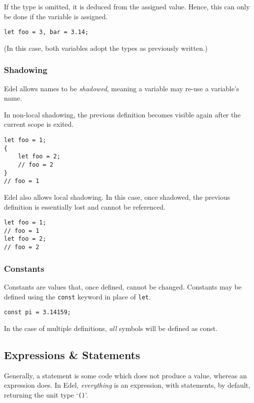 \documentclass{article}
\begin{document}
    If the type is omitted, it is deduced from the assigned value.
    Hence, this can only be done if the variable is assigned.
    \begin{lstlisting}[language=CustomLang]
let foo = 3, bar = 3.14;
    \end{lstlisting}
    (In this case, both variables adopt the types as previously written.)

    \subsubsection{Shadowing}

    Edel allows names to be \textit{shadowed}, meaning a variable may re-use a variable's name.

    In non-local shadowing, the previous definition becomes visible again after the current scope is exited.
    \begin{lstlisting}[language=CustomLang]
let foo = 1;
{
    let foo = 2;
    // foo = 2
}
// foo = 1
    \end{lstlisting}

    Edel also allows local shadowing.
    In this case, once shadowed, the previous definition is essentially lost and cannot be referenced.
    \begin{lstlisting}[language=CustomLang]
let foo = 1;
// foo = 1
let foo = 2;
// foo = 2
    \end{lstlisting}

    \subsubsection{Constants}

    Constants are values that, once defined, cannot be changed.
    Constants may be defined using the \texttt{const} keyword in place of \texttt{let}.

    \begin{lstlisting}[language=CustomLang]
const pi = 3.14159;
    \end{lstlisting}

    In the case of multiple definitions, \textit{all} symbols will be defined as const.

    \subsection{Expressions \& Statements}\label{subsec:expressions-&-statements}

    Generally, a statement is some code which does not produce a value, whereas an expression does.
    In Edel, \textit{everything} is an expression, with statements, by default, returning the unit type `\texttt{()}'.
\end{document}
